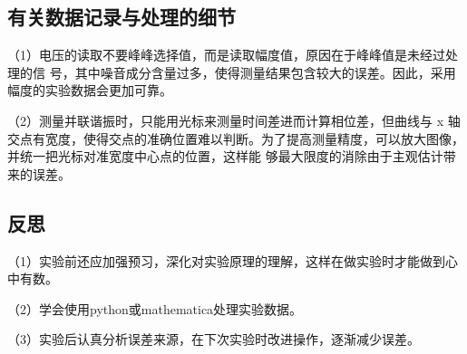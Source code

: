 \documentclass[UTF-8,twoside,cs4size]{ctexart}
\begin{document}
\subsection{有关数据记录与处理的细节}
（1）电压的读取不要峰峰选择值，而是读取幅度值，原因在于峰峰值是未经过处理的信
号，其中噪音成分含量过多，使得测量结果包含较大的误差。因此，采用幅度的实验数据会更加可靠。\par
（2）测量并联谐振时，只能用光标来测量时间差进而计算相位差，但曲线与 x 轴交点有宽度，使得交点的准确位置难以判断。为了提高测量精度，可以放大图像，并统一把光标对准宽度中心点的位置，这样能
够最大限度的消除由于主观估计带来的误差。



\subsection{反思}
（1）实验前还应加强预习，深化对实验原理的理解，这样在做实验时才能做到心中有数。\par
（2）学会使用python或mathematica处理实验数据。\par
（3）实验后认真分析误差来源，在下次实验时改进操作，逐渐减少误差。\par
\end{document}
